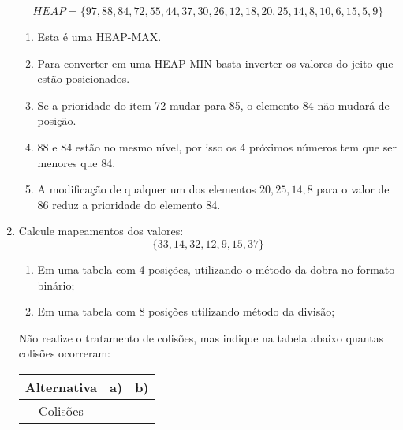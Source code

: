 \documentclass[11pt]{article}
\begin{document}
\begin{enumerate}[label=\textbf{Q\arabic*}]
          $$HEAP = \{97, 88, 84, 72, 55, 44, 37, 30, 26, 12, 18, 20, 25, 14, 8, 10, 6, 15, 5, 9\}$$
          \begin{enumerate}
              \item Esta é uma HEAP-MAX.
              \item Para converter em uma HEAP-MIN basta inverter os valores do jeito que estão posicionados.
              \item Se a prioridade do item 72 mudar para 85, o elemento 84 não mudará de posição.
              \item 88 e 84 estão no mesmo nível, por isso os 4 próximos números tem que ser menores que 84.
              \item A modificação de qualquer um dos elementos $20,25,14,8$ para o valor de 86 reduz a prioridade do elemento 84.
          \end{enumerate}

    \item Calcule mapeamentos dos valores:
          $$\{33,14,32,12,9,15,37\}$$
          \begin{enumerate}
              \item Em uma tabela com 4 posições, utilizando o método da dobra no formato binário;
              \item Em uma tabela com 8 posições utilizando método da divisão;
          \end{enumerate}
          Não realize o tratamento de colisões, mas indique na tabela abaixo quantas colisões ocorreram:
          \begin{center}
              \begin{tabular}{|c|c|c|}
                  \hline
                  Alternativa & a) & b) \\
                  \hline
                  Colisões    & \  & \  \\
                  \hline
              \end{tabular}
          \end{center}
\end{enumerate}
\end{document}
